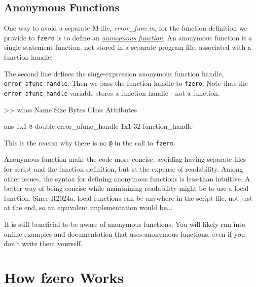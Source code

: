 \documentclass[../../book.tex]{subfiles}
\begin{document}
\subsection{Anonymous Functions}

One way to avoid a separate M-file, \emph{error\_func.m}, for the function definition we provide to \lstinline{fzero} is to define an 
\href{https://www.mathworks.com/help/matlab/matlab_prog/anonymous-functions.html}{\emph{anonymous function}}.  
An anonymous function is a single statement function, not stored in a separate program file, associated with a function handle.  



The second line defines the singe-expression anonymous function handle, \lstinline{error_afunc_handle}.  Then we pass the function handle to \lstinline{fzero}.  Note that the \lstinline{error_afunc_handle} variable stores a function handle - not a function.
\begin{code}
    >> whos
  Name                    Size            Bytes  Class              Attributes

  ans                     1x1                 8  double                       
  error_afunc_handle      1x1                32  function_handle    
\end{code}
This is the reason why there is no \lstinline{@} in the call to \lstinline{fzero}.

Anonymous function make the code more concise, avoiding having separate files for script and the function definition, but at the expense of readability.  Among other issues, the syntax for defining anonymous functions is less-than intuitive.  A better way of being concise while maintaining readability might be to use a local function.  Since R2024a, local functions can be anywhere in the script file, not just at the end, so an equivalent implementation would be...



It is still beneficial to be aware of anonymous functions.  You will likely run into online examples and documentation that uses anonymous functions, even if you don't write them yourself.

\section{How fzero Works}
\label{howfzero}
\end{document}
